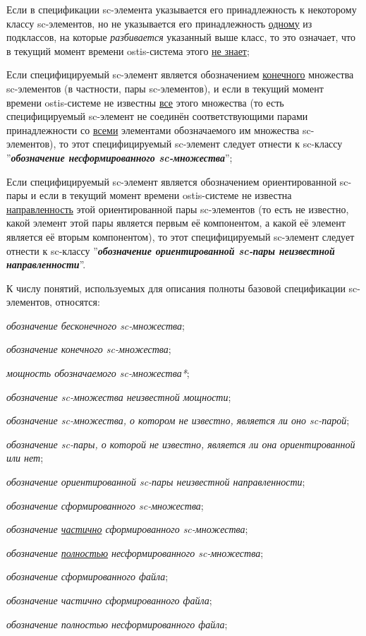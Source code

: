 \begin{textitemize}
	\item Если в спецификации sc-элемента указывается его принадлежность к некоторому классу sc-элементов, но не указывается его принадлежность \underline{одному} из подклассов, на которые \textit{разбивается} указанный выше класс, то это означает, что в текущий момент времени ostis-система этого \underline{не знает};
	\item Если специфицируемый sc-элемент является обозначением \underline{конечного} множества sc-элементов (в частности, пары sc-элементов), и если в текущий момент времени ostis-системе не известны \underline{все} этого множества (то есть специфицируемый sc-элемент не соединён соответствующими парами принадлежности со \underline{всеми} элементами обозначаемого им множества sc-элементов), то этот специфицируемый sc-элемент следует отнести к sc-классу ''\textbf{\textit{обозначение несформированного sc-множества}}'';
	\item Если специфицируемый sc-элемент является обозначением ориентированной sc-пары и если в текущий момент времени ostis-системе не известна \underline{направленность} этой ориентированной пары sc-элементов (то есть не известно, какой элемент этой пары является первым её компонентом, а какой её элемент является её вторым компонентом), то этот специфицируемый sc-элемент следует отнести к sc-классу ''\textbf{\textit{обозначение ориентированной sc-пары неизвестной направленности}}''.
\end{textitemize}

К числу понятий, используемых для описания полноты базовой спецификации sc-элементов, относятся:

\begin{textitemize}
	\item \textit{обозначение бесконечного sc-множества};
	\item \textit{обозначение конечного sc-множества};
	\item \textit{мощность обозначаемого sc-множества*};
	\item \textit{обозначение sc-множества неизвестной мощности};
	\item \textit{обозначение sc-множества, о котором не известно, является ли оно sc-парой};
	\item \textit{обозначение sc-пары, о которой не известно, является ли она ориентированной или нет};
	\item \textit{обозначение ориентированной sc-пары неизвестной направленности};
	\item \textit{обозначение сформированного sc-множества};
	\item \textit{обозначение \underline{частично} сформированного sc-множества};
	\item \textit{обозначение \underline{полностью} несформированного sc-множества};
	\item \textit{обозначение сформированного файла};
	\item \textit{обозначение частично сформированного файла};
	\item \textit{обозначение полностью несформированного файла};
\end{textitemize}

